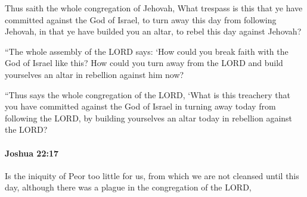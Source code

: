 			\begin{versebox}
					\item[BHS] 
					\item[ASV] Thus saith the whole congregation of Jehovah, What trespass is this that ye have committed against the God of Israel, to turn away this day from following Jehovah, in that ye have builded you an altar, to rebel this day against Jehovah?
					\item[NIV] “The whole assembly of the LORD says: ‘How could you break faith with the God of Israel like this? How could you turn away from the LORD and build yourselves an altar in rebellion against him now?
					\item[NRSV] “Thus says the whole congregation of the LORD, ‘What is this treachery that you have committed against the God of Israel in turning away today from following the LORD, by building yourselves an altar today in rebellion against the LORD?
			\end{versebox}

		\paragraph{Joshua 22:17} %
			\label{JOSHUA-22-17}

			Is the iniquity of Peor too little for us, from which we are not cleansed until this day, although there was a plague in the congregation of the LORD,

